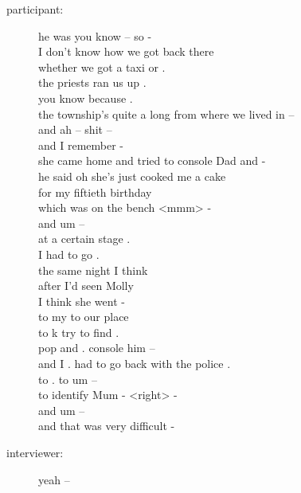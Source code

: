 \documentclass{article}
\newcommand{\turn}[2]{
\item[#1:] #2
}
\begin{document}
\begin{description}
\turn{participant}{he was you know -- so -\\
I don't know how we got back there\\
whether we got a taxi or .\\
the priests ran us up .\\
you know because .\\
the township's quite a long from where we lived in --\\
and ah -- shit --\\
and I remember -\\
she came home and tried to console Dad and -\\
he said oh she's just cooked me a cake\\
for my fiftieth birthday\\
which was on the bench <mmm> -\\
and um --\\
at a certain stage .\\
I had to go .\\
the same night I think\\
after I'd seen Molly\\
I think she went -\\
to my to our place\\
to k try to find .\\
pop and . console him --\\
and I . had to go back with the police .\\
to . to um --\\
to identify Mum - <right> -\\
and um --\\
and that was very difficult -}

\turn{interviewer}{yeah --}


\end{description}
\end{document}

